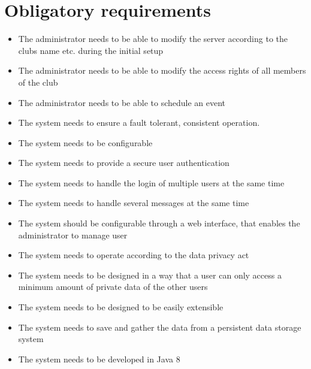 \section{Obligatory requirements}
\begin{itemize}
\item The administrator needs to be able to modify the server according to the clubs name etc. during the initial setup
\item The administrator needs to be able to modify the access rights of all members of the club
\item The administrator needs to be able to schedule an event
\item The system needs to ensure a fault tolerant, consistent operation.
\item The system needs to be configurable
\item The system needs to provide a secure user authentication
\item The system needs to handle the login of multiple users at the same time
\item The system needs to handle several messages at the same time
\item The system should be configurable through a web interface, that enables the administrator to manage user
\item The system needs to operate according to the data privacy act
\item The system needs to be designed in a way that a user can only access a minimum amount of private data of the other users
\item The system needs to be designed to be easily extensible
\item The system needs to save and gather the data from a persistent data storage system
\item The system needs to be developed in Java 8
\end{itemize}

